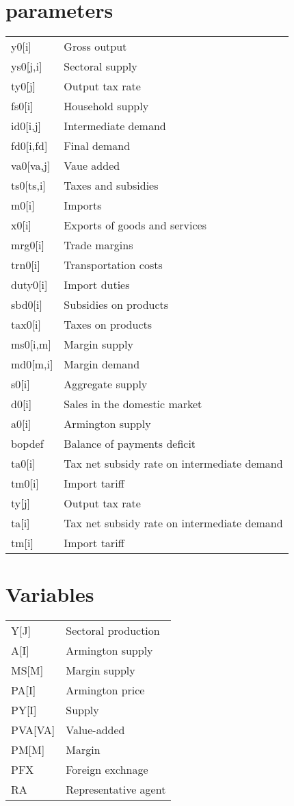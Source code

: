 \documentclass{amsart}
\begin{document}
\section{parameters}
\begin{table}[h!]
    \centering
\begin{tabular}{ll}
    y0[i]&Gross output\\ 
ys0[j,i]&Sectoral supply\\ 
ty0[j]&Output tax rate\\ 
fs0[i]&Household supply\\ 
id0[i,j]&Intermediate demand\\ 
fd0[i,fd]&Final demand\\ 
va0[va,j]&Vaue added\\ 
ts0[ts,i]&Taxes and subsidies\\ 
m0[i]&Imports\\ 
x0[i]&Exports of goods and services\\ 
mrg0[i]&Trade margins\\ 
trn0[i]&Transportation costs\\ 
duty0[i]&Import duties\\ 
sbd0[i]&Subsidies on products\\ 
tax0[i]&Taxes on products\\ 
ms0[i,m]&Margin supply\\ 
md0[m,i]&Margin demand\\ 
s0[i]&Aggregate supply\\ 
d0[i]&Sales in the domestic market\\ 
a0[i]&Armington supply\\ 
bopdef&Balance of payments deficit\\ 
ta0[i]&Tax net subsidy rate on intermediate demand\\ 
tm0[i]&Import tariff\\ 
ty[j]&Output tax rate\\ 
ta[i]&Tax net subsidy rate on intermediate demand\\ 
tm[i]&Import tariff
\end{tabular}
\end{table}

\section{Variables}
\begin{table}[h!]
\centering
\begin{tabular}{ll}
	Y[J]	&	Sectoral production\\
	A[I]	&	Armington supply\\
	MS[M]	&	Margin supply\\

	PA[I]	&	Armington price\\
	PY[I]	&	Supply\\
	PVA[VA]	&	Value-added\\
	PM[M]	&	Margin\\
	PFX	&	Foreign exchnage\\

	RA	&	Representative agent\\
\end{tabular}
\end{table}
\end{document}
